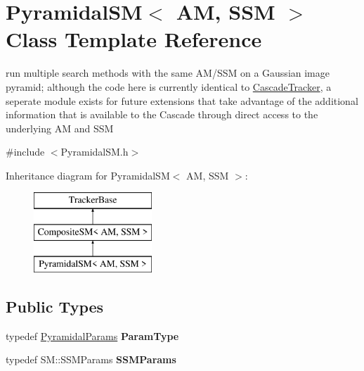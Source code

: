 \hypertarget{classPyramidalSM}{\section{Pyramidal\-S\-M$<$ A\-M, S\-S\-M $>$ Class Template Reference}
\label{classPyramidalSM}
}


run multiple search methods with the same A\-M/\-S\-S\-M on a Gaussian image pyramid; although the code here is currently identical to \hyperlink{classCascadeTracker}{Cascade\-Tracker}, a seperate module exists for future extensions that take advantage of the additional information that is available to the Cascade through direct access to the underlying A\-M and S\-S\-M  




{\ttfamily \#include $<$Pyramidal\-S\-M.\-h$>$}

Inheritance diagram for Pyramidal\-S\-M$<$ A\-M, S\-S\-M $>$\-:\begin{figure}[H]
\begin{center}
\leavevmode
\includegraphics[height=3.000000cm]{classPyramidalSM}
\end{center}
\end{figure}
\subsection*{Public Types}
\begin{DoxyCompactItemize}
\item 
\hypertarget{classPyramidalSM_aa672b02f7b5fa6004f8a47a92b02a058}{typedef \hyperlink{structPyramidalParams}{Pyramidal\-Params} {\bfseries Param\-Type}}\label{classPyramidalSM_aa672b02f7b5fa6004f8a47a92b02a058}

\item 
\hypertarget{classPyramidalSM_ab1839d1f7e499178deec69661d82897c}{typedef S\-M\-::\-S\-S\-M\-Params {\bfseries S\-S\-M\-Params}}\label{classPyramidalSM_ab1839d1f7e499178deec69661d82897c}

\end{DoxyCompactItemize}
